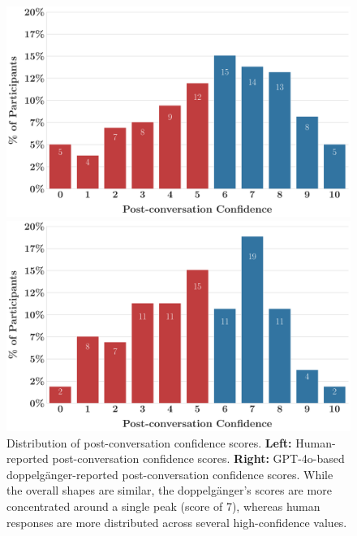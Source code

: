 \begin{figure}[ht!]
    \centering
    \begin{minipage}{0.48\textwidth}
        \centering
        \includegraphics[width=\linewidth]{fig/post-conf-human.pdf}
    \end{minipage}\hfill
    \begin{minipage}{0.49\textwidth}
        \centering
        \includegraphics[width=\linewidth]{fig/post-conf-gpt4-o.pdf}
    \end{minipage}
    \caption{Distribution of post-conversation confidence scores. \textbf{Left:} Human-reported post-conversation confidence scores. \textbf{Right:} GPT-4o-based doppelgänger-reported  post-conversation confidence scores. While the overall shapes are similar, the doppelgänger's scores are more concentrated around a single peak (score of 7), whereas human responses are more distributed across several high-confidence values.}
    \label{fig:post_conf_distributions}
\end{figure}


